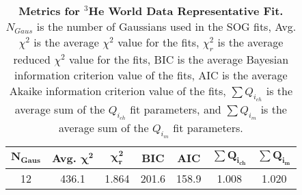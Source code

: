 
\begin{table}[!h]
\centering
\begin{tabular}{|c c c c c c c|}
\hline
\textbf{$\boldsymbol{N_{Gaus}}$} & \textbf{Avg. $\boldsymbol{\chi^2}$} & \textbf{$\boldsymbol{\chi^2_r}$} & \textbf{BIC} & \textbf{AIC} & \textbf{$\boldsymbol{\sum Q_{i_{ch}}}$} & \textbf{$\boldsymbol{\sum Q_{i_{m}}}$}\\
\hline
12 & 436.1 & 1.864 & 201.6 & 158.9 & 1.008 & 1.020\\
\hline
\end{tabular}
\caption[Metrics for $^3$He World Data Representative Fit]{{\bf{Metrics for $^3$He World Data Representative Fit.}} $N_{Gaus}$ is the number of Gaussians used in the SOG fits, Avg. $\chi^2$ is the average $\chi^2$ value for the fits, $\chi^2_r$ is the average reduced $\chi^2$ value for the fits, BIC is the average Bayesian information criterion value of the fits, AIC is the average Akaike information criterion value of the fits, $\sum Q_{i_{ch}}$ is the average sum of the $Q_{i_{ch}}$ fit parameters, and $\sum Q_{i_{m}}$ is the average sum of the $Q_{i_{m}}$ fit parameters.}
\label{tab:3he_rep_fit_stats}
\end{table}

